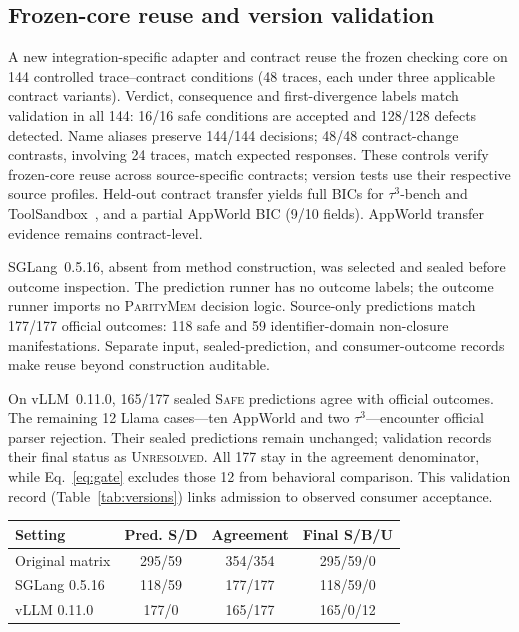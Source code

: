 \documentclass[letterpaper]{article}
\newcommand{\system}{\textsc{ParityMem}\xspace}
\begin{document}
\subsection{Frozen-core reuse and version validation}
A new integration-specific adapter and contract reuse the frozen checking
core on 144 controlled trace--contract conditions (48 traces, each under three
applicable contract variants). Verdict, consequence and first-divergence labels match validation
in all 144: 16/16 safe conditions are accepted and 128/128 defects detected.
Name aliases preserve 144/144 decisions; 48/48 contract-change contrasts,
involving 24 traces, match expected responses. These controls verify
frozen-core reuse across source-specific contracts; version tests use their
respective source profiles.
Held-out contract transfer yields full BICs for $\tau^3$-bench and
ToolSandbox~\cite{lu2025toolsandbox}, and a partial AppWorld BIC (9/10 fields).
AppWorld transfer evidence remains contract-level.

SGLang~0.5.16, absent from method construction, was selected and sealed
before outcome inspection. The prediction runner has no outcome labels;
the outcome runner imports no \system decision logic.
Source-only predictions match 177/177 official outcomes: 118 safe and
59 identifier-domain non-closure manifestations. Separate input, sealed-prediction,
and consumer-outcome records make reuse beyond construction auditable.

On vLLM~0.11.0, 165/177 sealed \textsc{Safe} predictions agree with official
outcomes. The remaining 12 Llama cases---ten AppWorld and two $\tau^3$---encounter
official parser rejection. Their sealed predictions remain unchanged;
validation records their final status as \textsc{Unresolved}. All 177 stay
in the agreement denominator, while Eq.~\eqref{eq:gate} excludes those 12
from behavioral comparison. This validation record (Table~\ref{tab:versions})
links admission to observed consumer acceptance.

\begingroup\setlength{\topsep}{0pt}\setlength{\partopsep}{0pt}
\begin{center}
\label{tab:versions}
\setlength{\tabcolsep}{3pt}
\renewcommand{\arraystretch}{1.03}
\begin{tabular}{@{}lccc@{}}
\toprule
Setting & Pred. S/D & Agreement & Final S/B/U \\
\midrule
Original matrix & 295/59 & 354/354 & 295/59/0 \\
SGLang 0.5.16 & 118/59 & 177/177 & 118/59/0 \\
vLLM 0.11.0 & 177/0 & 165/177 & 165/0/12 \\
\bottomrule
\end{tabular}
\end{center}
\endgroup
\end{document}
